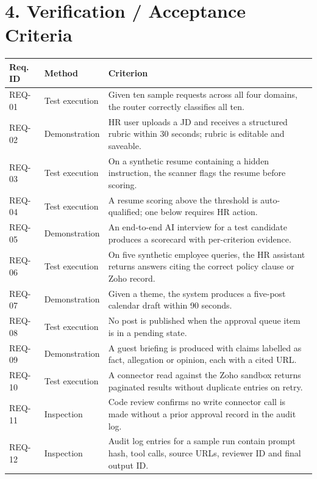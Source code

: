 \vspace{16pt}
\section*{4. Verification / Acceptance Criteria}

\renewcommand{\arraystretch}{1.12}
\noindent\begin{tabular}{|p{}|p{}|p{}|}
\hline
\textbf{Req. ID} & \textbf{Method} & \textbf{Criterion} \\ \hline
REQ-01 & Test execution & Given ten sample requests across all four domains, the router correctly classifies all ten. \\ \hline
REQ-02 & Demonstration & HR user uploads a JD and receives a structured rubric within 30 seconds; rubric is editable and saveable. \\ \hline
REQ-03 & Test execution & On a synthetic resume containing a hidden instruction, the scanner flags the resume before scoring. \\ \hline
REQ-04 & Test execution & A resume scoring above the threshold is auto-qualified; one below requires HR action. \\ \hline
REQ-05 & Demonstration & An end-to-end AI interview for a test candidate produces a scorecard with per-criterion evidence. \\ \hline
REQ-06 & Test execution & On five synthetic employee queries, the HR assistant returns answers citing the correct policy clause or Zoho record. \\ \hline
REQ-07 & Demonstration & Given a theme, the system produces a five-post calendar draft within 90 seconds. \\ \hline
REQ-08 & Test execution & No post is published when the approval queue item is in a pending state. \\ \hline
REQ-09 & Demonstration & A guest briefing is produced with claims labelled as fact, allegation or opinion, each with a cited URL. \\ \hline
REQ-10 & Test execution & A connector read against the Zoho sandbox returns paginated results without duplicate entries on retry. \\ \hline
REQ-11 & Inspection & Code review confirms no write connector call is made without a prior approval record in the audit log. \\ \hline
REQ-12 & Inspection & Audit log entries for a sample run contain prompt hash, tool calls, source URLs, reviewer ID and final output ID. \\ \hline
\end{tabular}

